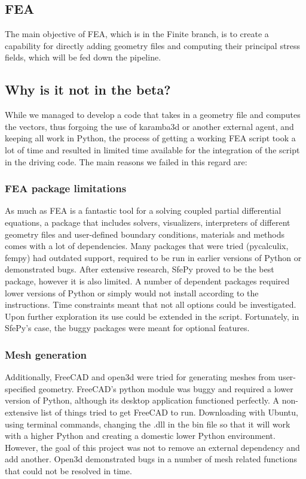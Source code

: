 \subsection{FEA}

The main objective of FEA, which is in the Finite branch, is to create a capability for directly adding geometry files and computing their principal stress fields, which will be fed down the pipeline.

\subsection{Why is it not in the beta?}

While we managed to develop a code that takes in a geometry file and computes the vectors, thus forgoing the use of karamba3d or another external agent, and keeping all work in Python, the process of getting a working FEA script took a lot of time and resulted in limited time available for the integration of the script in the driving code. The main reasons we failed in this regard are:

\subsubsection{FEA package limitations}

As much as FEA is a fantastic tool for a solving coupled partial differential equations, a package that includes solvers, visualizers, interpreters of different geometry files and user-defined boundary conditions, materials and methods comes with a lot of dependencies. Many packages that were tried (pycalculix, fempy) had outdated support, required to be run in earlier versions of Python or demonstrated bugs. After extensive research, SfePy proved to be the best package, however it is also limited. A number of dependent packages required lower versions of Python or simply would not install according to the instructions. Time constraints meant that not all options could be investigated. Upon further exploration its use could be extended in the script. Fortunately, in SfePy's case, the buggy packages were meant for optional features. 

\subsubsection{Mesh generation}

Additionally, FreeCAD and open3d were tried for generating meshes from user-specified geometry. FreeCAD's python module was buggy and required a lower version of Python, although its desktop application functioned perfectly. A non-extensive list of things tried to get FreeCAD to run. Downloading with Ubuntu, using terminal commands, changing the .dll in the bin file so that it will work with a higher Python and creating a domestic lower Python environment. However, the goal of this project was not to remove an external dependency and add another. Open3d demonstrated bugs in a number of mesh related functions that could not be resolved in time. 

